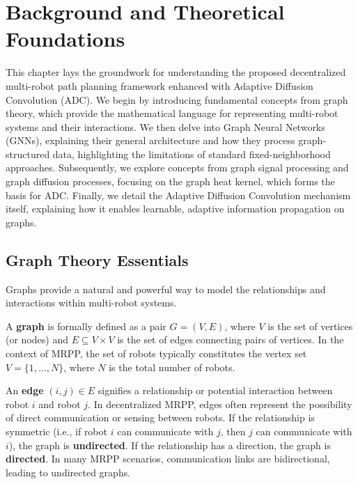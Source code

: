 \chapter{Background and Theoretical Foundations}
\label{chap:background}

This chapter lays the groundwork for understanding the proposed decentralized multi-robot path planning framework enhanced with Adaptive Diffusion Convolution (ADC). We begin by introducing fundamental concepts from graph theory, which provide the mathematical language for representing multi-robot systems and their interactions. We then delve into Graph Neural Networks (GNNs), explaining their general architecture and how they process graph-structured data, highlighting the limitations of standard fixed-neighborhood approaches. Subsequently, we explore concepts from graph signal processing and graph diffusion processes, focusing on the graph heat kernel, which forms the basis for ADC. Finally, we detail the Adaptive Diffusion Convolution mechanism itself, explaining how it enables learnable, adaptive information propagation on graphs.

\section{Graph Theory Essentials}
\label{sec:graph_theory}

Graphs provide a natural and powerful way to model the relationships and interactions within multi-robot systems.

A \textbf{graph} is formally defined as a pair $G = (V, E)$, where $V$ is the set of vertices (or nodes) and $E \subseteq V \times V$ is the set of edges connecting pairs of vertices. In the context of MRPP, the set of robots typically constitutes the vertex set $V = \{1, ..., N\}$, where $N$ is the total number of robots.

An \textbf{edge} $(i, j) \in E$ signifies a relationship or potential interaction between robot $i$ and robot $j$. In decentralized MRPP, edges often represent the possibility of direct communication or sensing between robots. If the relationship is symmetric (i.e., if robot $i$ can communicate with $j$, then $j$ can communicate with $i$), the graph is \textbf{undirected}. If the relationship has a direction, the graph is \textbf{directed}. In many MRPP scenarios, communication links are bidirectional, leading to undirected graphs.

